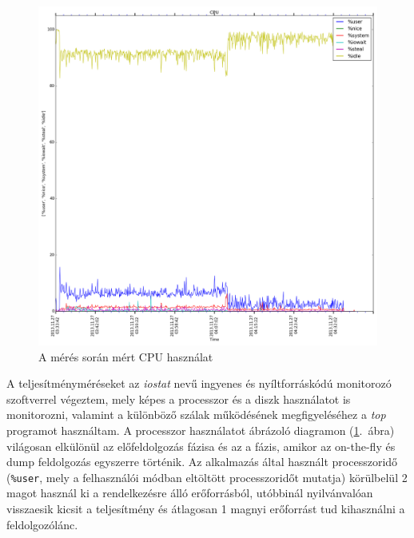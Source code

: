 \begin{figure}[htp]
\centering
\includegraphics[scale=0.3]{img/measurement_cpu}
\caption{A mérés során mért CPU használat}
\label{fig:measurement_cpu}
\end{figure}

A teljesítményméréseket az \textit{iostat} nevű ingyenes és nyíltforráskódú monitorozó szoftverrel végeztem, mely képes a processzor és a diszk használatot is monitorozni, valamint a különböző szálak működésének megfigyeléséhez a \textit{top} programot használtam. A processzor használatot ábrázoló diagramon (\ref{fig:measurement_cpu}.~ábra) világosan elkülönül az előfeldolgozás fázisa és az a fázis, amikor az on-the-fly és dump feldolgozás egyszerre történik. Az alkalmazás által használt processzoridő (\texttt{\%user}, mely a felhasználói módban eltöltött processzoridőt mutatja) körülbelül 2 magot használ ki a rendelkezésre álló erőforrásból, utóbbinál nyilvánvalóan visszaesik kicsit a teljesítmény és átlagosan 1 magnyi erőforrást tud kihasználni a feldolgozólánc.

